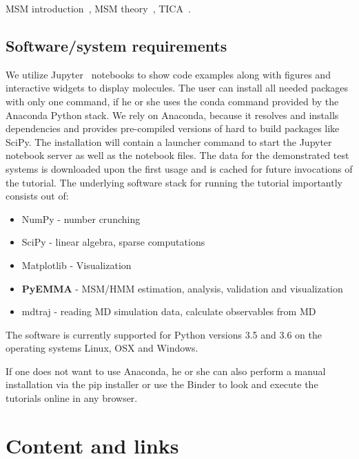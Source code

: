 \documentclass[9pt,tutorial]{livecoms}
\begin{document}
MSM introduction~\cite{msm-brooke}, MSM theory~\cite{msm-jhp,msm-book}, TICA~\cite{tica,tica3,tica2}.

\subsection{Software/system requirements}

We utilize Jupyter~\cite{jupyter} notebooks to show code examples along with figures and interactive widgets to display molecules. The user can install all needed packages with only one command, if he or she uses the conda command provided by the Anaconda Python stack. We rely on Anaconda, because it resolves and installs dependencies and provides pre-compiled versions of hard to build packages like SciPy. The installation will contain a launcher command to start the Jupyter notebook server as well as the notebook files. The data for the demonstrated test systems is downloaded upon the first usage and is cached for future invocations of the tutorial. The underlying software stack for running the tutorial importantly consists out of:
\begin{itemize}
 \item NumPy - number crunching
 \item SciPy - linear algebra, sparse computations
 \item Matplotlib - Visualization
 \item \textbf{PyEMMA} - MSM/HMM estimation, analysis, validation and visualization
 \item mdtraj - reading MD simulation data, calculate observables from MD
\end{itemize}

The software is currently supported for Python versions 3.5 and 3.6 on the operating systems Linux, OSX and Windows.

If one does not want to use Anaconda, he or she can also perform a manual installation via the pip installer or use the Binder to look and execute the tutorials online in any browser.


\section{Content and links}

\end{document}
